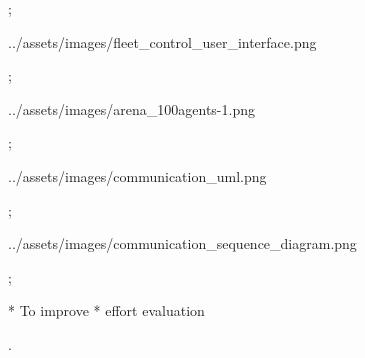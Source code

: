 \pg;


\centerline{\picw=16cm \inspic ../assets/images/fleet_control_user_interface.png }

\pg;



\centerline{\picw=14cm \inspic ../assets/images/arena_100agents-1.png }

\pg;



\centerline{\picw=16cm \inspic ../assets/images/communication_uml.png }

\pg;


\centerline{\picw=16cm \inspic ../assets/images/communication_sequence_diagram.png }

\pg;



* To improve
\typosize[14/14]
\begitems
* effort evaluation
\enditems

\pg.

